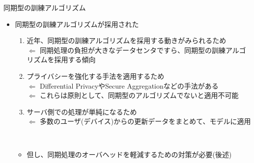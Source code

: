 \documentclass[dvipdfmx,notheorems,t]{beamer}
\begin{document}
\begin{frame}{同期型の訓練アルゴリズム}

\begin{itemize}
	\item \alert{同期型}の訓練アルゴリズムが採用された
	\begin{enumerate}
		\item 近年、同期型の訓練アルゴリズムを採用する動きがみられるため \\
		$\Leftarrow$ 同期処理の負担が大きなデータセンタですら、同期型の訓練アルゴリズムを採用する傾向
		\newline
		
		\item プライバシーを強化する手法を適用するため \\
		$\Leftarrow$ Differential PrivacyやSecure Aggregationなどの手法がある \\
		$\Leftarrow$ これらは原則として、同期型のアルゴリズムでないと適用不可能
		\newline
		
		\item サーバ側での処理が単純になるため \\
		$\Leftarrow$ 多数のユーザ(デバイス)からの更新データをまとめて、モデルに適用
	\end{enumerate} \
	
	\begin{itemize}
		\item 但し、同期処理のオーバヘッドを軽減するための対策が必要(後述)
	\end{itemize}
\end{itemize}

\end{frame}
\end{document}
